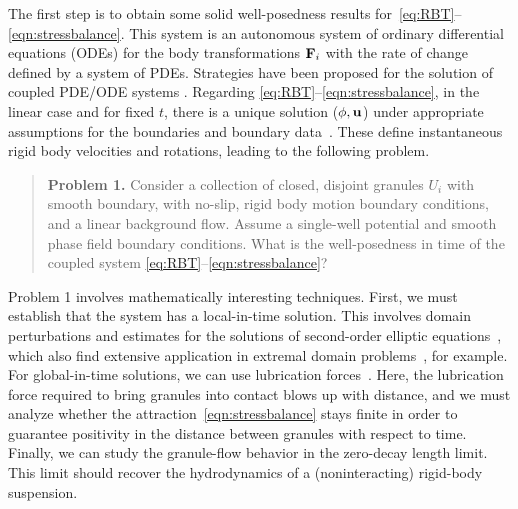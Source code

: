The first step is to obtain some solid well-posedness results
for~\eqref{eq:RBT}--\eqref{eqn:stressbalance}. This system is an
autonomous system of ordinary differential equations (ODEs) for the body
transformations $\mathbf{F}_i$ with the rate of change defined by a system of
PDEs. Strategies have been proposed for the solution of coupled PDE/ODE
systems \cite{Carichino2018EnergybasedOS,Quarteroni2016GeometricMM}.
Regarding \eqref{eq:RBT}--\eqref{eqn:stressbalance}, in the linear case
and for fixed $t$, there is a unique solution ($\phi, \mathbf{u}$) under
appropriate assumptions for the boundaries and boundary
data~\cite{manasthesis, rac-gre2016, LAX}. These define instantaneous
rigid body velocities and rotations, leading to the following problem.
\begin{quotation}
  \noindent
  \textbf{Problem 1.} 
  Consider a collection of closed, disjoint granules $U_i$ with smooth
  boundary, with no-slip, rigid body motion boundary conditions, and a
  linear background flow. Assume a single-well potential and smooth
  phase field boundary conditions. What is the well-posedness in time of
  the coupled system \eqref{eq:RBT}--\eqref{eqn:stressbalance}?
\end{quotation}
Problem 1 involves mathematically interesting techniques. First, we must
establish that the system has a local-in-time solution. This involves
domain perturbations and estimates for the solutions of second-order
elliptic equations~\cite{Savar2002DomainPA, DANERS20081,
Lamboley2015EstimatesOF}, which also find extensive application in
extremal domain problems~\cite{Schiffer1954VariationOD,
Henrot2006ExtremumPF, bogosel:hal-03607776,Bogosel2022OnTP}, for
example.
For global-in-time solutions, we can use lubrication
forces~\cite{cawthorn_balmforth_2010, leal_2007}. Here, the lubrication
force required to bring granules into contact blows up with distance,
and we must analyze whether the attraction~\eqref{eqn:stressbalance}
stays finite in order to guarantee positivity in the distance between
granules with respect to time.
Finally, we can study the granule-flow behavior in the
zero-decay length limit. This limit should recover the hydrodynamics of
a (noninteracting) rigid-body suspension.

